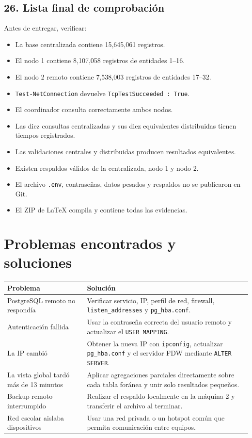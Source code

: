 \documentclass[12pt,letterpaper]{article}
\begin{document}
\subsection{26. Lista final de comprobación}

Antes de entregar, verificar:

\begin{itemize}
  \item La base centralizada contiene 15,645,061 registros.
  \item El nodo 1 contiene 8,107,058 registros de entidades 1--16.
  \item El nodo 2 remoto contiene 7,538,003 registros de entidades 17--32.
  \item \texttt{Test-NetConnection} devuelve
        \texttt{TcpTestSucceeded : True}.
  \item El coordinador consulta correctamente ambos nodos.
  \item Las diez consultas centralizadas y sus diez equivalentes distribuidas
        tienen tiempos registrados.
  \item Las validaciones centrales y distribuidas producen resultados
        equivalentes.
  \item Existen respaldos válidos de la centralizada, nodo 1 y nodo 2.
  \item El archivo \texttt{.env}, contraseñas, datos pesados y respaldos no se
        publicaron en Git.
  \item El ZIP de LaTeX compila y contiene todas las evidencias.
\end{itemize}

\section{Problemas encontrados y soluciones}

\begin{longtable}{p{}p{}}
\toprule
\textbf{Problema} & \textbf{Solución}\\
\midrule
\endhead
PostgreSQL remoto no respondía &
Verificar servicio, IP, perfil de red, firewall, \texttt{listen\_addresses} y
\texttt{pg\_hba.conf}.\\
Autenticación fallida &
Usar la contraseña correcta del usuario remoto y actualizar el
\texttt{USER MAPPING}.\\
La IP cambió &
Obtener la nueva IP con \texttt{ipconfig}, actualizar \texttt{pg\_hba.conf} y
el servidor FDW mediante \texttt{ALTER SERVER}.\\
La vista global tardó más de 13 minutos &
Aplicar agregaciones parciales directamente sobre cada tabla foránea y unir
solo resultados pequeños.\\
Backup remoto interrumpido &
Realizar el respaldo localmente en la máquina 2 y transferir el archivo al
terminar.\\
Red escolar aislaba dispositivos &
Usar una red privada o un hotspot común que permita comunicación entre equipos.\\
\bottomrule
\end{longtable}
\end{document}
